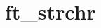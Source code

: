 \chapter{ft\+\_\+strchr}
\hypertarget{md_Documentation_2ft__strchr}{}\label{md_Documentation_2ft__strchr}
